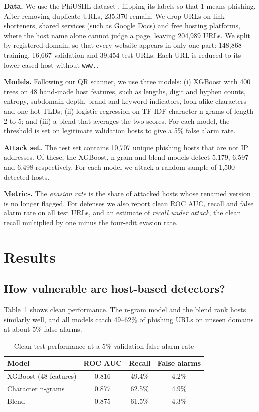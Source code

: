 \documentclass[conference]{IEEEtran}
\begin{document}
\textbf{Data.} We use the PhiUSIIL dataset \cite{prasad2024phiusiil}, flipping its labels so that 1 means phishing. After removing duplicate URLs, 235,370 remain. We drop URLs on link shorteners, shared services (such as Google Docs) and free hosting platforms, where the host name alone cannot judge a page, leaving 204,989 URLs. We split by registered domain, so that every website appears in only one part: 148,868 training, 16,667 validation and 39,454 test URLs. Each URL is reduced to its lower-cased host without \texttt{www.}.

\textbf{Models.} Following our QR scanner, we use three models: (i) XGBoost \cite{chen2016xgboost} with 400 trees on 48 hand-made host features, such as lengths, digit and hyphen counts, entropy, subdomain depth, brand and keyword indicators, look-alike characters and one-hot TLDs; (ii) logistic regression on TF-IDF character n-grams of length 2 to 5; and (iii) a blend that averages the two scores. For each model, the threshold is set on legitimate validation hosts to give a 5\% false alarm rate.

\textbf{Attack set.} The test set contains 10,707 unique phishing hosts that are not IP addresses. Of these, the XGBoost, n-gram and blend models detect 5,179, 6,597 and 6,498 respectively. For each model we attack a random sample of 1,500 detected hosts.

\textbf{Metrics.} The \emph{evasion rate} is the share of attacked hosts whose renamed version is no longer flagged. For defenses we also report clean ROC AUC, recall and false alarm rate on all test URLs, and an estimate of \emph{recall under attack}, the clean recall multiplied by one minus the four-edit evasion rate.

\section{Results}

\subsection{How vulnerable are host-based detectors?}

Table~\ref{tab:clean} shows clean performance. The n-gram model and the blend rank hosts similarly well, and all models catch 49--62\% of phishing URLs on unseen domains at about 5\% false alarms.

\begin{table}[t]
\centering
\caption{Clean test performance at a 5\% validation false alarm rate}
\label{tab:clean}
\begin{tabular}{@{}lccc@{}}
\toprule
Model & ROC AUC & Recall & False alarms \\
\midrule
XGBoost (48 features) & 0.816 & 49.4\% & 4.2\% \\
Character n-grams & 0.877 & 62.5\% & 4.9\% \\
Blend & 0.875 & 61.5\% & 4.3\% \\
\bottomrule
\end{tabular}
\end{table}
\end{document}
